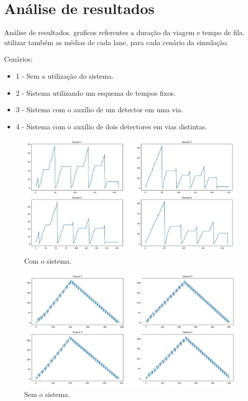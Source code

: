 \chapter{Análise de resultados}

Análise de resultados. graficos referentes a duração da viagem e tempo de fila. utilizar também as médias de cada lane, para cada cenário da simulação.

Cenários:
\begin{itemize}
\item 1 - Sem a utilização do sistema.
\item 2 - Sistema utilizando um esquema de tempos fixos.
\item 3 - Sistema com o auxílio de um detector em uma via.
\item 4 - Sistema com o auxílio de dois detectores em vias distintas.
\end{itemize}

\begin{figure}[ht]
    \begin{center}
    \includegraphics[width=1\textwidth]{figuras/queueDurationTL.JPG}
    \end{center}
    \caption[Duração das filas]{Com o sistema.}
    \label{queueTL}
\end{figure}

\begin{figure}[ht]
    \begin{center}
    \includegraphics[width=1\textwidth]{figuras/queueDurationNoTL.JPG}
    \end{center}
    \caption[Duração das filas]{Sem o sistema.}
    \label{queueNoTL}
\end{figure}

